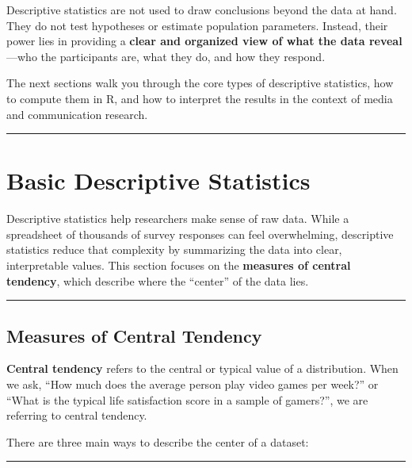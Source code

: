 \documentclass[
]{book}
\begin{document}
Descriptive statistics are not used to draw conclusions beyond the data at hand. They do not test hypotheses or estimate population parameters. Instead, their power lies in providing a \textbf{clear and organized view of what the data reveal}---who the participants are, what they do, and how they respond.

The next sections walk you through the core types of descriptive statistics, how to compute them in R, and how to interpret the results in the context of media and communication research.

\begin{center}\rule{0.5\linewidth}{0.5pt}\end{center}

\section{Basic Descriptive Statistics}\label{basic-descriptive-statistics}

Descriptive statistics help researchers make sense of raw data. While a spreadsheet of thousands of survey responses can feel overwhelming, descriptive statistics reduce that complexity by summarizing the data into clear, interpretable values. This section focuses on the \textbf{measures of central tendency}, which describe where the ``center'' of the data lies.

\begin{center}\rule{0.5\linewidth}{0.5pt}\end{center}

\subsection*{\texorpdfstring{\textbf{Measures of Central Tendency}}{Measures of Central Tendency}}\label{measures-of-central-tendency}

\textbf{Central tendency} refers to the central or typical value of a distribution. When we ask, ``How much does the average person play video games per week?'' or ``What is the typical life satisfaction score in a sample of gamers?'', we are referring to central tendency.

There are three main ways to describe the center of a dataset:

\begin{center}\rule{0.5\linewidth}{0.5pt}\end{center}
\end{document}
